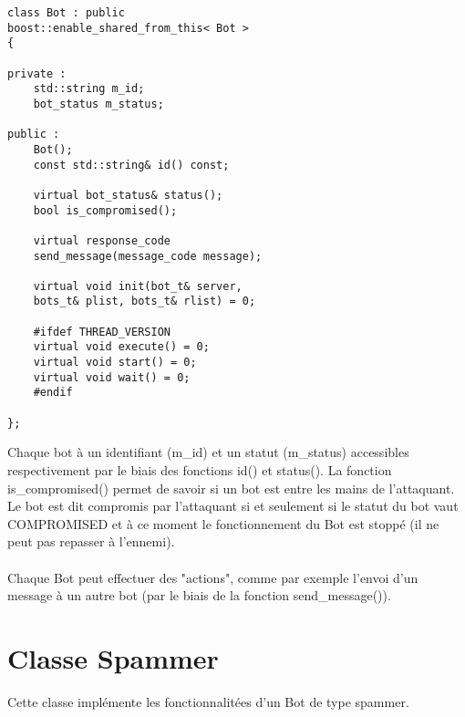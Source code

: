 \documentclass[11pt]{article}
\begin{document}
\begin{minipage}[c]{.46\linewidth}
\begin{verbatim} 
class Bot : public 
boost::enable_shared_from_this< Bot >
{

private :
	std::string m_id;
	bot_status m_status;

public :
	Bot();
	const std::string& id() const;
	
	virtual bot_status& status();
	bool is_compromised();
	
	virtual response_code 
	send_message(message_code message);
	
	virtual void init(bot_t& server, 
	bots_t& plist, bots_t& rlist) = 0;
	
	#ifdef THREAD_VERSION
	virtual void execute() = 0;
	virtual void start() = 0;
	virtual void wait() = 0;
	#endif
	
};
\end{verbatim}	
\end{minipage} \hfill
\begin{minipage}[c]{.46\linewidth}
Chaque bot à un identifiant (m\_id) et un statut (m\_status) accessibles respectivement par le biais des fonctions id() et status(). La fonction is\_compromised() permet de savoir si un bot est entre les mains de l'attaquant. Le bot est dit compromis par l'attaquant si et seulement si le statut du bot vaut COMPROMISED et à ce moment le fonctionnement du Bot est stoppé (il ne peut pas repasser à l'ennemi).\\\\Chaque Bot peut effectuer des "actions", comme par exemple l'envoi d'un message à un autre bot (par le biais de la fonction send\_message()).
\end{minipage}

\newpage
\section{Classe Spammer}
Cette classe implémente les fonctionnalitées d'un Bot de type spammer.\\
\end{document}
